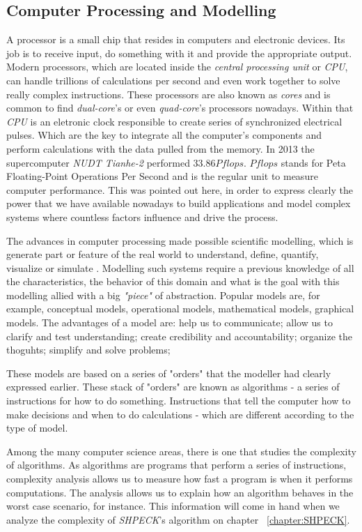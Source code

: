 \documentclass[ppgc,mestrado,english]{iiufrgs}
\begin{document}
\subsection{Computer Processing and Modelling}
A processor is a small chip that resides in computers and electronic devices. Its job is to receive input, do something with it and provide the appropriate output. Modern processors, which are located inside the \emph{central processing unit} or \emph{CPU}, can handle trillions of calculations per second and even work together to solve really complex instructions. These processors are also known as \emph{cores} and is common to find \emph{dual-core}'s or even \emph{quad-core}'s processors nowadays. Within that \emph{CPU} is an eletronic clock responsible to create series of synchronized electrical pulses. Which are the key to integrate all the computer's components and perform calculations with the data pulled from the memory. In 2013 the supercomputer \emph{NUDT Tianhe-2} performed $33.86 Pflops$. $Pflops$ stands for Peta Floating-Point Operations Per Second and is the regular unit to measure computer performance. 
This was pointed out here, in order to express clearly the power that we have available nowadays to build applications and model complex systems where countless factors influence and drive the process.

The advances in computer processing made possible scientific modelling, which is generate part or feature of the real world to understand, define, quantify, visualize or simulate \cite{Humphreys:04}. Modelling such systems require a previous knowledge of all the characteristics, the behavior of this domain and what is the goal with this modelling allied with a big \emph{"piece"} of abstraction. Popular models are, for example, conceptual models, operational models, mathematical models, graphical models. The advantages of a model are: help us to communicate; allow us to clarify and test understanding; create credibility and accountability; organize the thoguhts; simplify and solve problems; 

These models are based on a series of "orders" that the modeller had clearly expressed earlier. These stack of "orders" are known as algorithms - a series of instructions for how to do something. Instructions that tell the computer how to make decisions and when to do calculations - which are different according to the type of model.

Among the many computer science areas, there is one that studies the complexity of algorithms. As algorithms are programs that perform a series of instructions, complexity analysis allows us to measure how fast a program is when it performs computations. The analysis allows us to explain how an algorithm behaves in the worst case scenario, for instance. 
This information will come in hand when we analyze the complexity of \emph{SHPECK}'s algorithm on chapter ~\ref{chapter:SHPECK}.
\end{document}
